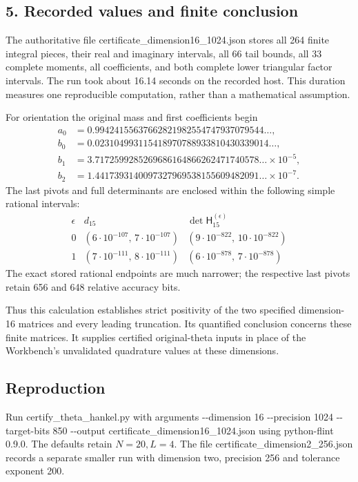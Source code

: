 \subsection{5. Recorded values and finite conclusion}\label{recorded-values-and-finite-conclusion}

The authoritative file certificate\_dimension16\_1024.json stores all 264 finite integral pieces, their real and imaginary intervals, all 66 tail bounds, all 33 complete moments, all coefficients, and both complete lower triangular factor intervals. The run took about 16.14 seconds on the recorded host. This duration measures one reproducible computation, rather than a mathematical assumption.

For orientation the original mass and first coefficients begin \[
\begin{split}
 a_0&=0.99424155637662821982554747937079544\ldots,\\
 b_0&=0.023104993115418970788933810430339014\ldots,\\
 b_1&=3.7172599285269686164866262471740578\ldots\times10^{-5},\\
 b_2&=1.4417393140097327969538155609482091\ldots\times10^{-7}.
\end{split}
\tag{CH.18}
\] The last pivots and full determinants are enclosed within the following simple rational intervals: \[
\begin{array}{c|c|c}
 \epsilon&
 d_{15}&\det \mathsf H_{15}^{(\epsilon)}\\ \hline
 0&(6\cdot10^{-107},\,7\cdot10^{-107})
   &(9\cdot10^{-822},\,10\cdot10^{-822})\\
 1&(7\cdot10^{-111},\,8\cdot10^{-111})
   &(6\cdot10^{-878},\,7\cdot10^{-878})
\end{array}
\tag{CH.19}
\] The exact stored rational endpoints are much narrower; the respective last pivots retain 656 and 648 relative accuracy bits.

Thus this calculation establishes strict positivity of the two specified dimension-16 matrices and every leading truncation. Its quantified conclusion concerns these finite matrices. It supplies certified original-theta inputs in place of the Workbench's unvalidated quadrature values at these dimensions.

\subsection{Reproduction}\label{reproduction}

Run certify\_theta\_hankel.py with arguments -\kern0pt-dimension 16 -\kern0pt-precision 1024 -\kern0pt-target-bits 850 -\kern0pt-output certificate\_dimension16\_1024.json using python-flint 0.9.0. The defaults retain \(N=20,L=4\). The file certificate\_dimension2\_256.json records a separate smaller run with dimension two, precision 256 and tolerance exponent 200.

